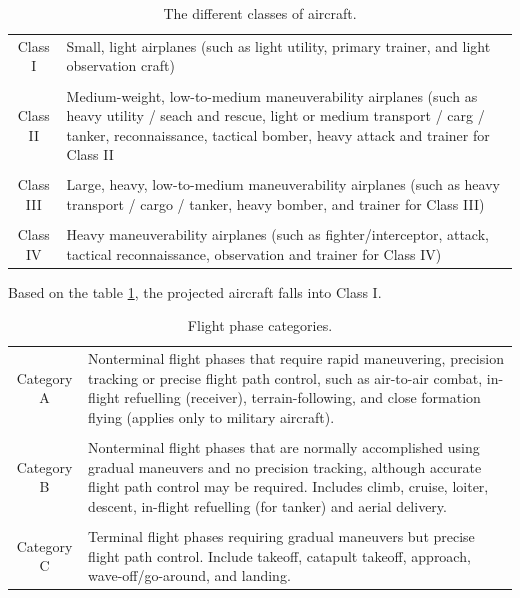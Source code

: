 \documentclass[english,fira]{ist-report}
\begin{document}
\begin{table}[ht]
    \centering
    \begin{tabular}{c m{10cm}}\toprule
        Class I & Small, light airplanes (such as light utility, primary trainer, and light observation craft) \\
        & \\
        Class II & Medium-weight, low-to-medium maneuverability airplanes (such as heavy utility / seach and rescue, light or medium transport / carg / tanker, reconnaissance, tactical bomber, heavy attack and trainer for Class II \\
        & \\
        Class III & Large, heavy, low-to-medium maneuverability airplanes (such as heavy transport / cargo / tanker, heavy bomber, and trainer for Class III) \\
        & \\
        Class IV & Heavy maneuverability airplanes (such as fighter/interceptor, attack, tactical reconnaissance, observation and trainer for Class IV) \\
        \bottomrule
    \end{tabular}
    \caption{The different classes of aircraft.}
    \label{tab:aircraft classes}
\end{table}
Based on the table \ref{tab:aircraft classes}, the projected aircraft falls into Class I.

\begin{table}[ht]
    \centering
    \begin{tabular}{c m{10cm}}\toprule
        Category A & Nonterminal flight phases that require rapid maneuvering, precision tracking or precise flight path control, such as air-to-air combat, in-flight refuelling (receiver), terrain-following, and close formation flying (applies only to military aircraft). \\
        & \\
        Category B & Nonterminal flight phases that are normally accomplished using gradual maneuvers and no precision tracking, although accurate flight path control may be required. Includes climb, cruise, loiter, descent, in-flight refuelling (for tanker) and aerial delivery. \\
        & \\
        Category C & Terminal flight phases requiring gradual maneuvers but precise flight path control. Include takeoff, catapult takeoff, approach, wave-off/go-around, and landing. \\
        \bottomrule
    \end{tabular}
    \caption{Flight phase categories.}
    \label{tab:flying qualities}
\end{table}
\end{document}
